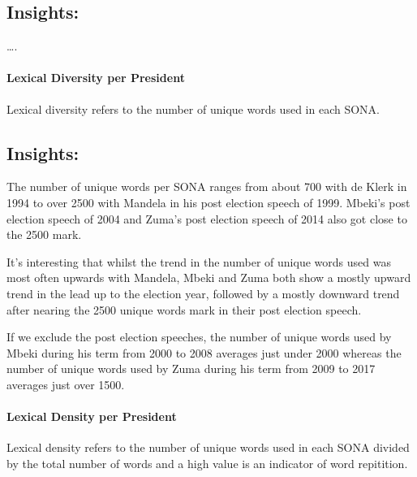 \documentclass[]{article}
\let\oldparagraph\paragraph
\renewcommand{\paragraph}[1]{\oldparagraph{#1}\mbox{}}
\begin{document}
\hypertarget{insights-3}{%
\subsection{\texorpdfstring{\textbf{Insights:}}{Insights:}}\label{insights-3}}

\ldots{}.

\hypertarget{lexical-diversity-per-president}{%
\paragraph{\texorpdfstring{\textbf{Lexical Diversity per
President}}{Lexical Diversity per President}}\label{lexical-diversity-per-president}}

Lexical diversity refers to the number of unique words used in each
SONA.

\hypertarget{insights-4}{%
\subsection{\texorpdfstring{\textbf{Insights:}}{Insights:}}\label{insights-4}}

The number of unique words per SONA ranges from about 700 with de Klerk
in 1994 to over 2500 with Mandela in his post election speech of 1999.
Mbeki's post election speech of 2004 and Zuma's post election speech of
2014 also got close to the 2500 mark.

It's interesting that whilst the trend in the number of unique words
used was most often upwards with Mandela, Mbeki and Zuma both show a
mostly upward trend in the lead up to the election year, followed by a
mostly downward trend after nearing the 2500 unique words mark in their
post election speech.

If we exclude the post election speeches, the number of unique words
used by Mbeki during his term from 2000 to 2008 averages just under 2000
whereas the number of unique words used by Zuma during his term from
2009 to 2017 averages just over 1500.

\hypertarget{lexical-density-per-president}{%
\paragraph{\texorpdfstring{\textbf{Lexical Density per
President}}{Lexical Density per President}}\label{lexical-density-per-president}}

Lexical density refers to the number of unique words used in each SONA
divided by the total number of words and a high value is an indicator of
word repitition.
\end{document}
